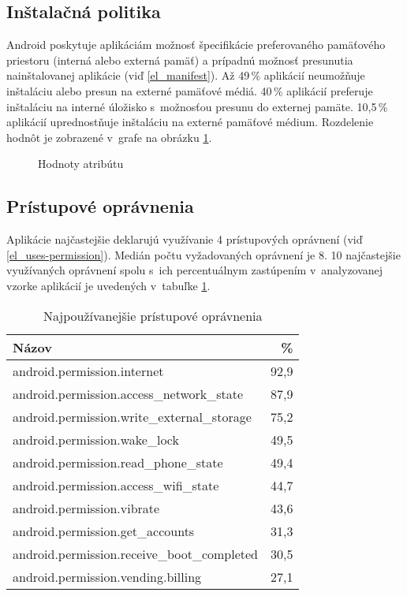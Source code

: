 \subsection*{Inštalačná politika}
Android poskytuje aplikáciám možnosť špecifikácie preferovaného pamäťového priestoru (interná alebo externá pamäť) a prípadnú možnosť presunutia nainštalovanej aplikácie (viď \ref{el_manifest}). Až 49\,\% aplikácií neumožňuje inštaláciu alebo presun na externé pamäťové médiá.  40\,\% aplikácií preferuje inštaláciu na interné úložisko s~možnosťou presunu do externej pamäte. 10,5\,\% aplikácií uprednostňuje inštaláciu na externé pamäťové médium. Rozdelenie hodnôt je zobrazené v~grafe na obrázku \ref{installLocFig}.

\begin{figure}[htb]
\centering
{}
\caption{Hodnoty atribútu }
\label{installLocFig}
\end{figure}

\subsection*{Prístupové oprávnenia}

Aplikácie najčastejšie deklarujú využívanie 4 prístupových oprávnení (viď \ref{el_uses-permission}). Medián počtu vyžadovaných oprávnení je 8. 10 najčastejšie využívaných oprávnení spolu s~ich percentuálnym zastúpením v~analyzovanej vzorke aplikácií je uvedených v~tabuľke \ref{tab:permissions}. 
\begin{table}[!htbp]
\centering
  \begin{tabular}{|l r|}
    \hline
    Názov & \% \\\hline\hline
    android.permission.internet & 92,9 \\
    android.permission.access\_network\_state & 87,9 \\
    android.permission.write\_external\_storage & 75,2 \\
    android.permission.wake\_lock & 49,5 \\
    android.permission.read\_phone\_state & 49,4 \\
    android.permission.access\_wifi\_state & 44,7 \\
    android.permission.vibrate & 43,6 \\
    android.permission.get\_accounts & 31,3 \\
    android.permission.receive\_boot\_completed & 30,5 \\
    android.permission.vending.billing & 27,1 \\
    \hline
  \end{tabular}
  \caption{Najpoužívanejšie prístupové oprávnenia}
  \label{tab:permissions}
\end{table}

